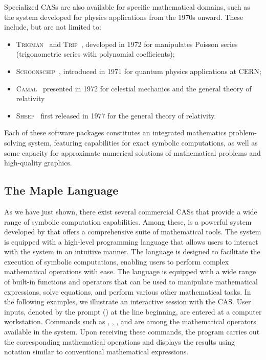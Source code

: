 %
Specialized \acp{CAS} are also available for specific mathematical domains, such as the system developed for physics applications from the 1970s onward. These include, but are not limited to:
%
\begin{itemize}
  \setlength{\itemsep}{0.0em}
  \item \textsc{Trigman}~\cite{jeffreys1972trigman} and \textsc{Trip}~\cite{gastineau2011trip}, developed in 1972 for manipulates Poisson series (trigonometric series with polynomial coefficients);
  \item \textsc{Schoonschip}~\cite{strubbe1974presentation}, introduced in 1971 for quantum physics applications at \ac{CERN};
  \item \textsc{Camal}~\cite{bourne1972camal} presented in 1972 for celestial mechanics and the general theory of relativity
  \item \textsc{Sheep}~\cite{frick1977computer} first released in 1977 for the general theory of relativity.
\end{itemize}
%
Each of these software packages constitutes an integrated mathematics problem-solving system, featuring capabilities for exact symbolic computations, as well as some capacity for approximate numerical solutions of mathematical problems and high-quality graphics.

\subsection{The Maple Language}

As we have just shown, there exist several commercial \acp{CAS} that provide a wide range of symbolic computation capabilities. Among these, \Maple{} is a powerful system developed by \MapleSoft{} that offers a comprehensive suite of mathematical tools. The \Maple{} system is equipped with a high-level programming language that allows users to interact with the system in an intuitive manner. The \Maple{} language is designed to facilitate the execution of symbolic computations, enabling users to perform complex mathematical operations with ease. The language is equipped with a wide range of built-in functions and operators that can be used to manipulate mathematical expressions, solve equations, and perform various other mathematical tasks. In the following examples, we illustrate an interactive session with the \Maple{} \ac{CAS}. User inputs, denoted by the prompt (\code{>}) at the line beginning, are entered at a computer workstation. Commands such as , , , and  are among the mathematical operators available in the \Maple{} system. Upon receiving these commands, the program carries out the corresponding mathematical operations and displays the results using notation similar to conventional mathematical expressions.

